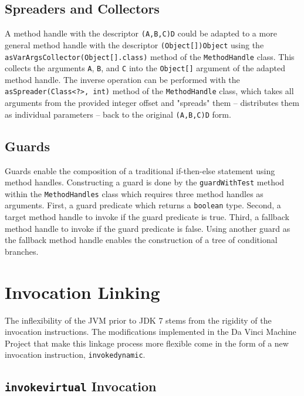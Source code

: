 \subsection{Spreaders and Collectors}

A method handle with the descriptor \texttt{(A,B,C)D} could be adapted to a more general method handle with the descriptor \texttt{(Object[])Object} using the \texttt{asVarArgsCollector(Object[].class)} method of the \texttt{MethodHandle} class.  This collects the arguments \texttt{A}, \texttt{B}, and \texttt{C} into the \texttt{Object[]} argument of the adapted method handle.  The inverse operation can be performed with the \texttt{asSpreader(Class<?>, int)} method of the \texttt{MethodHandle} class, which takes all arguments from the provided integer offset and "spreads" them -- distributes them as individual parameters -- back to the original \texttt{(A,B,C)D} form.

\subsection{Guards}

Guards enable the composition of a traditional if-then-else statement using method handles.  Constructing a guard is done by the \texttt{guardWithTest} method within the \texttt{MethodHandles} class which requires three method handles as arguments.  First, a guard predicate which returns a \texttt{boolean} type.  Second, a target method handle to invoke if the guard predicate is true.  Third, a fallback method handle to invoke if the guard predicate is false.  Using another guard as the fallback method handle enables the construction of a tree of conditional branches.

\section{Invocation Linking}

The inflexibility of the JVM prior to JDK 7 stems from the rigidity of the invocation instructions.  The modifications implemented in the Da Vinci Machine Project that make this linkage process more flexible come in the form of a new invocation instruction, \texttt{invokedynamic}.

\subsection{\texttt{invokevirtual} Invocation}

